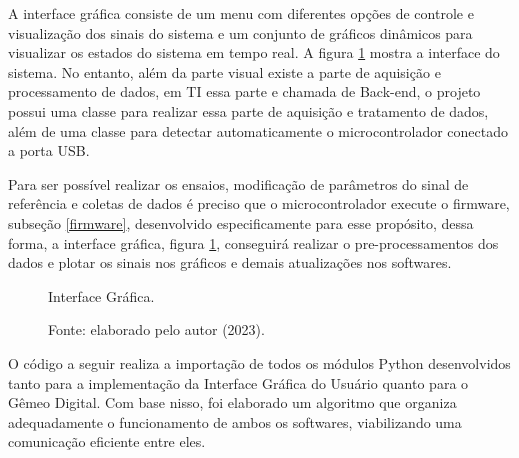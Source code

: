 
A interface gráfica consiste de um menu com diferentes opções de controle e visualização dos sinais do sistema e um conjunto de gráficos dinâmicos para visualizar os estados do sistema em tempo real. A figura \ref{fig3:image_14} mostra a interface do sistema. No entanto, além da parte visual existe a parte de aquisição e processamento de dados, em TI essa parte e chamada de Back-end, o projeto possui uma classe para realizar essa parte de aquisição e tratamento de dados, além de uma classe para detectar automaticamente o microcontrolador conectado a porta USB.

Para ser possível realizar os ensaios, modificação de parâmetros do sinal de referência e coletas de dados é preciso que o microcontrolador execute o firmware, subseção \ref{firmware}, desenvolvido especificamente para esse propósito, dessa forma, a interface gráfica, figura \ref{fig3:image_14}, conseguirá realizar o pre-processamentos dos dados e plotar os sinais nos gráficos e demais atualizações nos softwares.

\begin{figure}[!h]
	\centering
	\caption{Interface Gráfica.}
        \vspace{0.001cm}
	\caption*{Fonte: elaborado pelo autor (2023).}
	\label{fig3:image_14}
\end{figure}



O código a seguir realiza a importação de todos os módulos Python desenvolvidos tanto para a implementação da Interface Gráfica do Usuário quanto para o Gêmeo Digital. Com base nisso, foi elaborado um algoritmo que organiza adequadamente o funcionamento de ambos os softwares, viabilizando uma comunicação eficiente entre eles.

\vspace{0.5cm}

